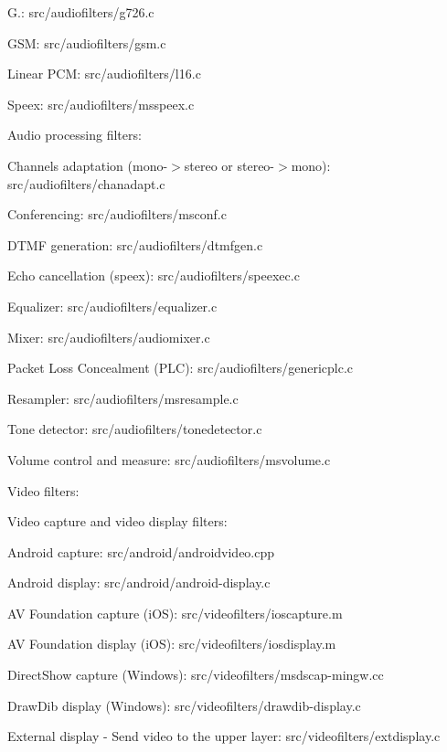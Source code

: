 \begin{DoxyItemize}
\begin{DoxyItemize}
\begin{DoxyItemize}
\item G.\+: src/audiofilters/g726.\+c
\item G\+SM\+: src/audiofilters/gsm.\+c
\item Linear P\+CM\+: src/audiofilters/l16.\+c
\item Speex\+: src/audiofilters/msspeex.\+c
\end{DoxyItemize}
\item Audio processing filters\+:
\begin{DoxyItemize}
\item Channels adaptation (mono-\/$>$stereo or stereo-\/$>$mono)\+: src/audiofilters/chanadapt.\+c
\item Conferencing\+: src/audiofilters/msconf.\+c
\item D\+T\+MF generation\+: src/audiofilters/dtmfgen.\+c
\item Echo cancellation (speex)\+: src/audiofilters/speexec.\+c
\item Equalizer\+: src/audiofilters/equalizer.\+c
\item Mixer\+: src/audiofilters/audiomixer.\+c
\item Packet Loss Concealment (P\+LC)\+: src/audiofilters/genericplc.\+c
\item Resampler\+: src/audiofilters/msresample.\+c
\item Tone detector\+: src/audiofilters/tonedetector.\+c
\item Volume control and measure\+: src/audiofilters/msvolume.\+c
\end{DoxyItemize}
\end{DoxyItemize}
\item Video filters\+:
\begin{DoxyItemize}
\item Video capture and video display filters\+:
\begin{DoxyItemize}
\item Android capture\+: src/android/androidvideo.\+cpp
\item Android display\+: src/android/android-\/display.\+c
\item AV Foundation capture (i\+OS)\+: src/videofilters/ioscapture.\+m
\item AV Foundation display (i\+OS)\+: src/videofilters/iosdisplay.\+m
\item Direct\+Show capture (Windows)\+: src/videofilters/msdscap-\/mingw.\+cc
\item Draw\+Dib display (Windows)\+: src/videofilters/drawdib-\/display.\+c
\item External display -\/ Send video to the upper layer\+: src/videofilters/extdisplay.\+c

\end{DoxyItemize}
\end{DoxyItemize}
\end{DoxyItemize}
